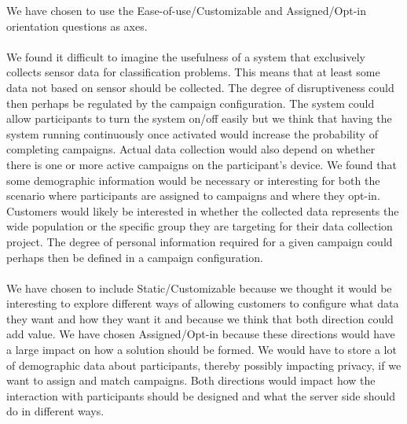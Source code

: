 We have chosen to use the Ease-of-use/Customizable and Assigned/Opt-in orientation questions as axes. 
\\\\
We found it difficult to imagine the usefulness of a system that exclusively collects sensor data for classification problems. This means that at least some data not based on sensor should be collected. The degree of disruptiveness could then perhaps be regulated by the campaign configuration. 
The system could allow participants to turn the system on/off easily but we think that having the system running continuously once activated would increase the probability of completing campaigns. Actual data collection would also depend on whether there is one or more active campaigns on the participant's device.
We found that some demographic information would be necessary or interesting for both the scenario where participants are assigned to campaigns and where they opt-in. Customers would likely be interested in whether the collected data represents the wide population or the specific group they are targeting for their data collection project. The degree of personal information required for a given campaign could perhaps then be defined in a campaign configuration. 
\\\\
We have chosen to include Static/Customizable because we thought it would be interesting to explore different ways of allowing customers to configure what data they want and how they want it and because we think that both direction could add value. We have chosen Assigned/Opt-in because these directions would have a large impact on how a solution should be formed. We would have to store a lot of demographic data about participants, thereby possibly impacting privacy, if we want to assign and match campaigns. Both directions would impact how the interaction with participants should be designed and what the server side should do in different ways.



